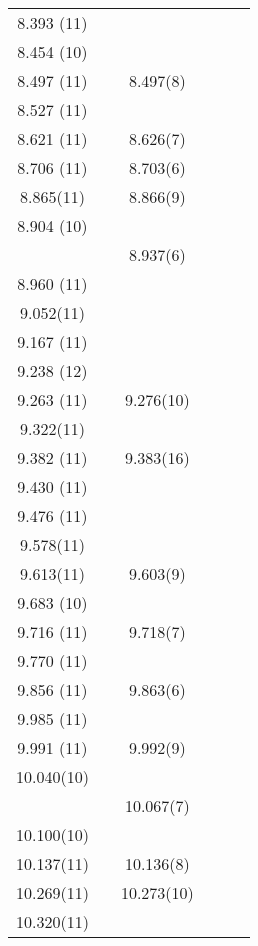 \begin{center}
\begin{longtable}{cc cc cc}
  8.393 (11)    &   &   &   &   &   \\
  8.454 (10)    &   &   &   &   &   \\
  8.497 (11)    &   &  8.497(8)   &   &   &   \\
  8.527 (11)    &   &   &   &   &   \\
  8.621 (11)    &   &  8.626(7)   &   &   &   \\
  8.706 (11)    &   &  8.703(6)   &   &   &   \\
   8.865(11)    &   &  8.866(9)   &   &   &   \\
  8.904 (10)    &   &   &   &   &   \\
  &   &  8.937(6)   &   &   &   \\
  8.960 (11)    &   &   &   &   &   \\
   9.052(11)    &   &   &   &   &   \\
  9.167 (11)    &   &   &   &   &   \\
  9.238 (12)    &   &   &   &   &   \\
  9.263 (11)    &   &  9.276(10)  &   &   &   \\
   9.322(11)    &   &   &   &   &   \\
  9.382 (11)    &   &  9.383(16)  &   &   &   \\
  9.430 (11)    &   &   &   &   &   \\
  9.476 (11)    &   &   &   &   &   \\
   9.578(11)    &   &   &   &   &   \\
   9.613(11)    &   &  9.603(9)   &   &   &   \\
  9.683 (10)    &   &   &   &   &   \\
  9.716 (11)    &   &  9.718(7)   &   &   &   \\
  9.770 (11)    &   &   &   &   &   \\
  9.856 (11)    &   &  9.863(6)   &   &   &   \\
  9.985 (11)    &   &   &   &   &   \\
  9.991 (11)    &   &  9.992(9)   &   &   &   \\
  10.040(10)    &   &   &   &   &   \\
  &   &  10.067(7)  &   &   &   \\
  10.100(10)    &   &   &   &   &   \\
  10.137(11)    &   &  10.136(8)  &   &   &   \\
  10.269(11)    &   &  10.273(10) &   &   &   \\
  10.320(11)    &   &   &   &   &   \\

\end{longtable}
\end{center}
